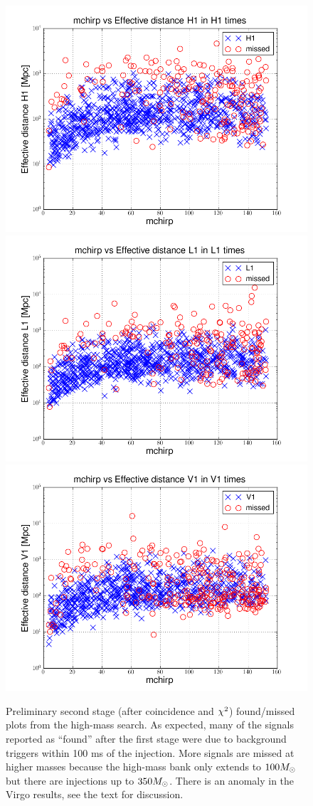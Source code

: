 \begin{figure}
  \includegraphics[width=0.5\linewidth]{figures/ninja2_results/H1-plotinspmissed_HIGH_FULL_DATA_mchirp-eff_dist-log-H1-871147552-5209912} 
  \includegraphics[width=0.5\linewidth]{figures/ninja2_results/L1-plotinspmissed_HIGH_FULL_DATA_mchirp-eff_dist-log-L1-871147552-5209912} \\
  \includegraphics[width=0.5\linewidth]{figures/ninja2_results/V1-plotinspmissed_HIGH_FULL_DATA_mchirp-eff_dist-log-V1-871147552-5209912} \\
  \caption[Second stage found/missed plots from the high-mass search]{
  \label{f:ninja2_cbc_results_high_second}
Preliminary second stage (after coincidence and $\chi^2$) found/missed plots from
the high-mass search.  As expected, many of the signals reported as
``found'' after the first stage were due to background triggers within
100 ms of the injection.  More signals are missed at higher masses
because the high-mass bank only extends to $100 M_\odot$ but there are
injections up to $350 M_\odot$.  There is an anomaly in the Virgo
results, see the text for discussion.
}
\end{figure}%

